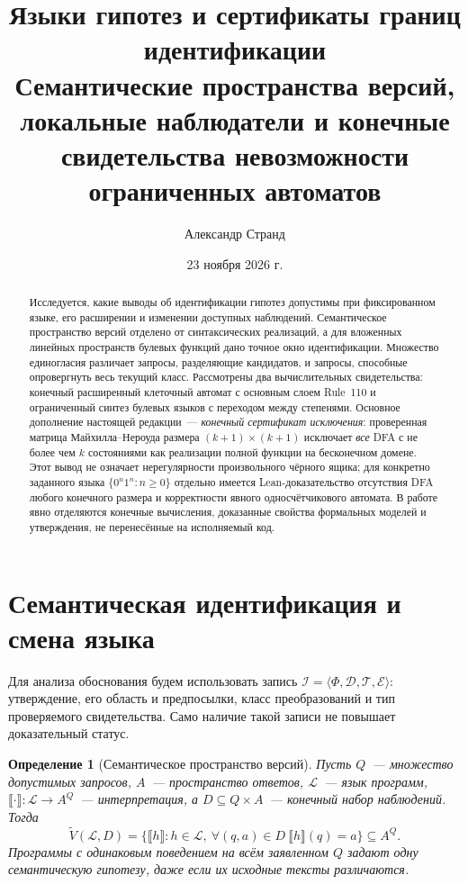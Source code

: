 \documentclass[11pt,a4paper]{article}
\title{\bfseries\color{ink}Языки гипотез и сертификаты границ идентификации\\[4pt]
\large\normalfont Семантические пространства версий, локальные наблюдатели и конечные свидетельства невозможности ограниченных автоматов}
\author{Александр Странд}
\date{23 ноября 2026 г.}
\newtheorem{definition}{Определение}[section]
\newcommand{\sem}[1]{\llbracket #1\rrbracket}
\newcommand{\VS}{\widetilde V}
\begin{document}
\maketitle
\vspace{-1.0em}
\begin{abstract}
\noindent Исследуется, какие выводы об идентификации гипотез допустимы при фиксированном языке, его расширении и изменении доступных наблюдений. Семантическое пространство версий отделено от синтаксических реализаций, а для вложенных линейных пространств булевых функций дано точное окно идентификации. Множество единогласия различает запросы, разделяющие кандидатов, и запросы, способные опровергнуть весь текущий класс. Рассмотрены два вычислительных свидетельства: конечный расширенный клеточный автомат с основным слоем Rule~110 и ограниченный синтез булевых языков с переходом между степенями. Основное дополнение настоящей редакции~--- \emph{конечный сертификат исключения}: проверенная матрица Майхилла--Нероуда размера $(k+1)\times(k+1)$ исключает \emph{все} DFA с не более чем $k$ состояниями как реализации полной функции на бесконечном домене. Этот вывод не означает нерегулярности произвольного чёрного ящика; для конкретно заданного языка $\{0^n1^n:n\ge0\}$ отдельно имеется Lean-доказательство отсутствия DFA любого конечного размера и корректности явного односчётчикового автомата. В работе явно отделяются конечные вычисления, доказанные свойства формальных моделей и утверждения, не перенесённые на исполняемый код.
\end{abstract}

\section{Семантическая идентификация и смена языка}

Для анализа обоснования будем использовать запись $\mathcal I=\langle\Phi,\mathcal D,\mathcal T,\mathcal E\rangle$: утверждение, его область и предпосылки, класс преобразований и тип проверяемого свидетельства. Само наличие такой записи не повышает доказательный статус.

\begin{definition}[Семантическое пространство версий]
Пусть $Q$~--- множество допустимых запросов, $A$~--- пространство ответов, $\mathcal L$~--- язык программ, $\sem\cdot:\mathcal L\to A^Q$~--- интерпретация, а $D\subseteq Q\times A$~--- конечный набор наблюдений. Тогда
\begin{equation}\label{eq:version}
\VS(\mathcal L,D)=\{\sem h:h\in\mathcal L,\ \forall(q,a)\in D\ \sem h(q)=a\}\subseteq A^Q.
\end{equation}
Программы с одинаковым поведением на всём заявленном $Q$ задают одну семантическую гипотезу, даже если их исходные тексты различаются.
\end{definition}
\end{document}
